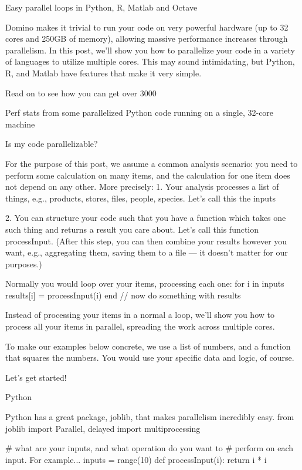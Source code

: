 
Easy parallel loops in Python, R, Matlab and Octave

Domino makes it trivial to run your code on very powerful hardware (up to 32 cores and 250GB of memory), allowing massive performance increases through parallelism. In this post, we'll show you how to parallelize your code in a variety of languages to utilize multiple cores. This may sound intimidating, but Python, R, and Matlab have features that make it very simple.

Read on to see how you can get over 3000%


Perf stats from some parallelized Python code running on a single, 32-core machine




Is my code parallelizable?

For the purpose of this post, we assume a common analysis scenario: you need to perform some calculation on many items, and the calculation for one item does not depend on any other. More precisely:
 1.
Your analysis processes a list of things, e.g., products, stores, files, people, species. Let's call this the inputs

 2.
You can structure your code such that you have a function which takes one such thing and returns a result you care about. Let's call this function processInput. (After this step, you can then combine your results however you want, e.g., aggregating them, saving them to a file — it doesn't matter for our purposes.)

 
Normally you would loop over your items, processing each one:
for i in inputs
    results[i] = processInput(i)
end
// now do something with results

 Instead of processing your items in a normal a loop, we'll show you how to process all your items in parallel, spreading the work across multiple cores.

To make our examples below concrete, we use a list of numbers, and a function that squares the numbers. You would use your specific data and logic, of course.

Let's get started!

Python

Python has a great package, joblib, that makes parallelism incredibly easy. 
from joblib import Parallel, delayed  
import multiprocessing

# what are your inputs, and what operation do you want to 
# perform on each input. For example...
inputs = range(10)  
def processInput(i):  
    return i * i

